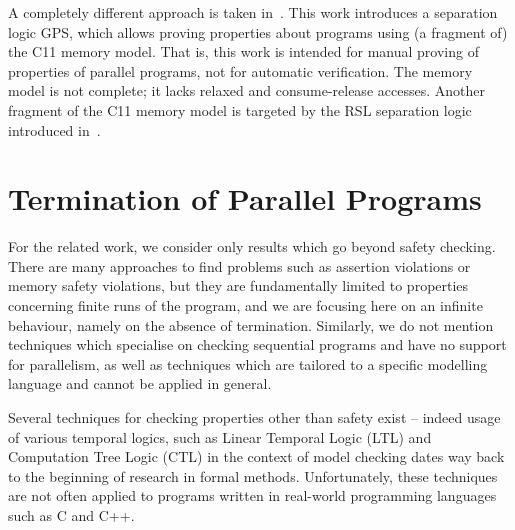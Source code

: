 A completely different approach is taken in~\cite{Turon2014}.
This work introduces a separation logic GPS, which allows proving properties about programs using (a fragment of) the C11 memory model.
That is, this work is intended for manual proving of properties of parallel programs, not for automatic verification.
The memory model is not complete; it lacks relaxed and consume-release accesses.
Another fragment of the C11 memory model is targeted by the RSL separation logic introduced in~\cite{Vafeiadis2013}.

\section{Termination of Parallel Programs}

For the related work, we consider only results which go beyond safety checking.
There are many approaches to find problems such as assertion violations or memory safety violations, but they are fundamentally limited to properties concerning finite runs of the program, and we are focusing here on an infinite behaviour, namely on the absence of termination.
Similarly, we do not mention techniques which specialise on checking sequential programs and have no support for parallelism, as well as techniques which are tailored to a specific modelling language and cannot be applied in general.

Several techniques for checking properties other than safety exist -- indeed
usage of various temporal logics, such as Linear Temporal Logic (LTL)
\cite[Chapter 5]{PoMC} and Computation Tree Logic (CTL) \cite[Chapter 6]{PoMC} in the context of model checking dates way back to the beginning of research in formal methods.
Unfortunately, these techniques are not often applied to programs written in real-world programming languages such as C and C++.


